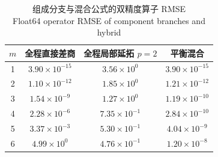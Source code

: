 \begin{table}[H]
\centering
\caption{组成分支与混合公式的双精度算子 RMSE\\Float64 operator RMSE of component branches and hybrid}
\label{tab:component-ablation}
\small
\begin{tabular}{cccc}
\toprule
$m$ & 全程直接差商 & 全程局部延拓 $p=2$ & 平衡混合\\
\midrule
1 & $3.90\times10^{-15}$ & $3.56\times10^{0}$ & $3.90\times10^{-15}$\\
2 & $1.10\times10^{-12}$ & $1.85\times10^{0}$ & $1.21\times10^{-12}$\\
3 & $1.54\times10^{-9}$ & $1.27\times10^{0}$ & $1.19\times10^{-10}$\\
4 & $2.28\times10^{-6}$ & $7.35\times10^{-1}$ & $2.84\times10^{-10}$\\
5 & $3.37\times10^{-3}$ & $5.30\times10^{-1}$ & $4.04\times10^{-9}$\\
6 & $4.99\times10^{0}$ & $4.76\times10^{-1}$ & $1.20\times10^{-8}$\\
\bottomrule
\end{tabular}
\end{table}
